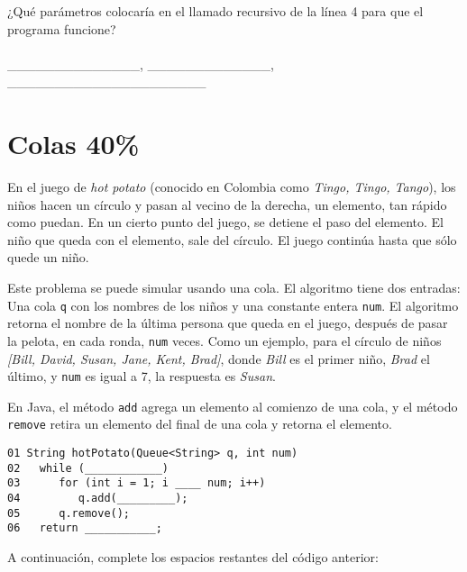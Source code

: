 \documentclass[twocolumn]{article}
\begin{document}
¿Qué parámetros colocaría en el llamado recursivo de la línea 4 para que el programa funcione?
	\\
	\\
	\_\_\_\_\_\_\_\_\_\_\_\_\_\_, \_\_\_\_\_\_\_\_\_\_\_\_\_, \_\_\_\_\_\_\_\_\_\_\_\_\_\_\_\_\_\_\_\_\_


\section{Colas 40\%}
{\small
En el juego de \textit{hot potato} (conocido en Colombia como \textit{Tingo, Tingo, Tango}), los niños
hacen un círculo y pasan al vecino de la derecha, un elemento,
 tan rápido como puedan. En un cierto punto del juego,
 se detiene el paso del elemento. El niño que queda con el
 elemento, sale del círculo. El juego continúa
 hasta que sólo quede un niño.

 Este problema se puede simular usando una cola. El algoritmo
 tiene dos entradas: Una cola \texttt{q}  con los nombres de los niños y una constante entera \texttt{num}. El algoritmo retorna el nombre de la última persona que queda en el juego, después de pasar la pelota, en cada ronda, \texttt{num} veces. Como un ejemplo, para el círculo de niños \textit{[Bill, David, Susan, Jane, Kent, Brad]},
donde \textit{Bill} es el primer niño, \textit{Brad} el último,
y \texttt{num} es igual a 7, la respuesta es \textit{Susan}.


 En Java, el método \texttt{add} agrega un elemento
 al comienzo de una cola, y el método \texttt{remove} retira un elemento del final de una cola y retorna el elemento.
}

{\small
\begin{verbatim}
01 String hotPotato(Queue<String> q, int num)
02   while (____________)
03      for (int i = 1; i ____ num; i++)
04         q.add(_________);
05      q.remove();
06   return ___________;
\end{verbatim}
}


{\small
A continuación, complete los espacios restantes del código anterior:
}
\end{document}
